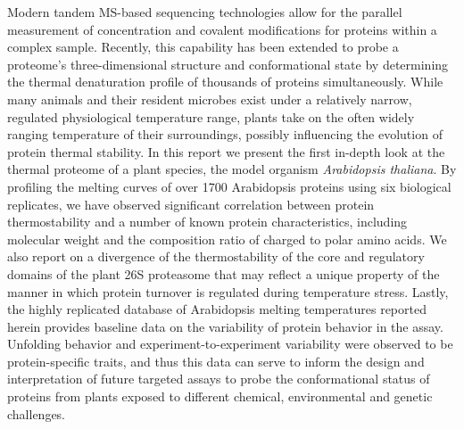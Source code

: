 Modern tandem MS-based sequencing technologies allow for the parallel
measurement of concentration and covalent modifications for proteins within a
complex sample. Recently, this capability has been extended to probe a
proteome's three-dimensional structure and conformational state by determining
the thermal denaturation profile of thousands of proteins simultaneously.
While many animals and their resident microbes exist under a relatively
narrow, regulated physiological temperature range, plants take on the often
widely ranging temperature of their surroundings, possibly influencing the
evolution of protein thermal stability. In this report we present the first
in-depth look at the thermal proteome of a plant species, the model organism
\textit{Arabidopsis thaliana}. By profiling the melting curves of over 1700
Arabidopsis proteins using six biological replicates, we have observed
significant correlation between protein thermostability and a number of known
protein characteristics, including molecular weight and the composition ratio
of charged to polar amino acids. We also report on a divergence of the
thermostability of the core and regulatory domains of the plant 26S proteasome
that may reflect a unique property of the manner in which protein turnover is
regulated during temperature stress. Lastly, the highly replicated database of
Arabidopsis melting temperatures reported herein provides baseline data on the
variability of protein behavior in the assay. Unfolding behavior and
experiment-to-experiment variability were observed to be protein-specific
traits, and thus this data can serve to inform the design and interpretation
of future targeted assays to probe the conformational status of proteins from
plants exposed to different chemical, environmental and genetic challenges.
